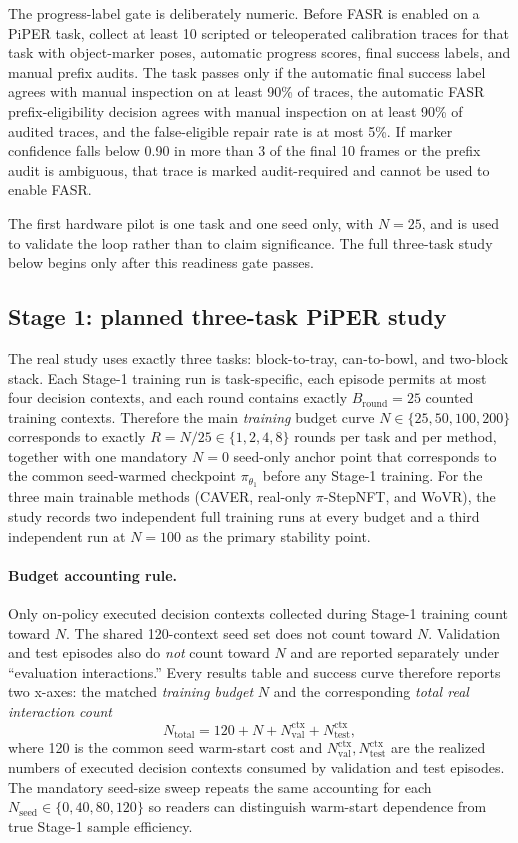 \documentclass[10pt]{article}
\theoremstyle{plain}
\theoremstyle{definition}
\theoremstyle{remark}
\begin{document}
The progress-label gate is deliberately numeric. Before FASR is enabled on a PiPER task, collect at least 10 scripted or teleoperated calibration traces for that task with object-marker poses, automatic progress scores, final success labels, and manual prefix audits. The task passes only if the automatic final success label agrees with manual inspection on at least 90\% of traces, the automatic FASR prefix-eligibility decision agrees with manual inspection on at least 90\% of audited traces, and the false-eligible repair rate is at most 5\%. If marker confidence falls below 0.90 in more than 3 of the final 10 frames or the prefix audit is ambiguous, that trace is marked audit-required and cannot be used to enable FASR.

The first hardware pilot is one task and one seed only, with $N=25$, and is used to validate the loop rather than to claim significance. The full three-task study below begins only after this readiness gate passes.

\subsection{Stage 1: planned three-task PiPER study}
The real study uses exactly three tasks: block-to-tray, can-to-bowl, and two-block stack. Each Stage-1 training run is task-specific, each episode permits at most four decision contexts, and each round contains exactly $B_{\mathrm{round}}=25$ counted training contexts. Therefore the main \emph{training} budget curve $N\in\{25,50,100,200\}$ corresponds to exactly $R=N/25\in\{1,2,4,8\}$ rounds per task and per method, together with one mandatory $N=0$ seed-only anchor point that corresponds to the common seed-warmed checkpoint $\pi_{\theta_1}$ before any Stage-1 training. For the three main trainable methods (CAVER, real-only $\pi$-StepNFT, and WoVR), the study records two independent full training runs at every budget and a third independent run at $N=100$ as the primary stability point.

\paragraph{Budget accounting rule.}
Only on-policy executed decision contexts collected during Stage-1 training count toward $N$. The shared 120-context seed set does not count toward $N$. Validation and test episodes also do \emph{not} count toward $N$ and are reported separately under ``evaluation interactions.'' Every results table and success curve therefore reports two x-axes: the matched \emph{training budget} $N$ and the corresponding \emph{total real interaction count}
\[
N_{\mathrm{total}} = 120 + N + N_{\mathrm{val}}^{\mathrm{ctx}} + N_{\mathrm{test}}^{\mathrm{ctx}},
\]
where 120 is the common seed warm-start cost and $N_{\mathrm{val}}^{\mathrm{ctx}},N_{\mathrm{test}}^{\mathrm{ctx}}$ are the realized numbers of executed decision contexts consumed by validation and test episodes. The mandatory seed-size sweep repeats the same accounting for each $N_{\mathrm{seed}}\in\{0,40,80,120\}$ so readers can distinguish warm-start dependence from true Stage-1 sample efficiency.
\end{document}
